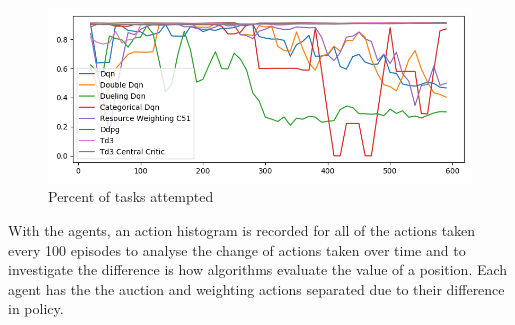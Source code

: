 \begin{figure}[H]
    \centering
    \includegraphics[width=\linewidth]{figures/5_evaluation_figs/algo_training_fig/percent_tasks.png}
    \caption{Percent of tasks attempted}
    \label{fig:algo_percent_tasks}
\end{figure}

With the agents, an action histogram is recorded for all of the actions taken every 100 episodes to analyse the change
of actions taken over time and to investigate the difference is how algorithms evaluate the value of a position. Each
agent has the the auction and weighting actions separated due to their difference in policy. \\


